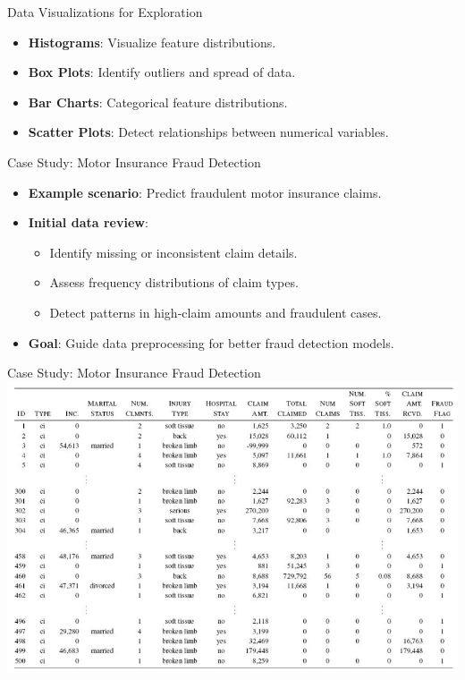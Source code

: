 \documentclass[aspectratio=169,xcolor=dvipsnames]{beamer}
\begin{document}
\begin{frame}{Data Visualizations for Exploration}
\begin{itemize}
    \setlength\itemsep{0.5cm}
    \item \textbf{Histograms}: Visualize feature distributions.
    \item \textbf{Box Plots}: Identify outliers and spread of data.
    \item \textbf{Bar Charts}: Categorical feature distributions.
    \item \textbf{Scatter Plots}: Detect relationships between numerical variables.
\end{itemize}
\end{frame}

\begin{frame}{Case Study: Motor Insurance Fraud Detection}
\begin{itemize}
    \setlength\itemsep{0.5cm}
    \item \textbf{Example scenario}: Predict fraudulent motor insurance claims.
    \item \textbf{Initial data review}:
    \begin{itemize}
        \item Identify missing or inconsistent claim details.
        \item Assess frequency distributions of claim types.
        \item Detect patterns in high-claim amounts and fraudulent cases.
    \end{itemize}
    \item \textbf{Goal}: Guide data preprocessing for better fraud detection models.
\end{itemize}
\end{frame}
\begin{frame}{Case Study: Motor Insurance Fraud Detection}
\centering
\includegraphics[scale=0.32]{images/motor_dat.png}
\end{frame}
\end{document}
